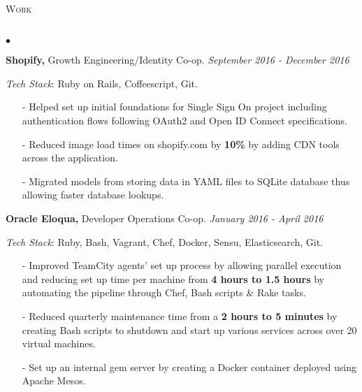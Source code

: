 \documentclass[11pt]{article}
\newcommand{\lineunder}{\vspace*{-8pt} \\ \hspace*{-18pt} \hrulefill \\}
\newcommand{\header}[1]{{\hspace*{-15pt}\vspace*{6pt} \textsc{#1}} \vspace*{-6pt} \lineunder }
\newenvironment{achievements}{\begin{list}{$\bullet$}{\topsep 0pt \itemsep -1.5pt \leftmargin 5pt}}{\vspace*{4pt}\end{list}}
\begin{document}
\header{\fontsize{11.4}{10}\selectfont Work}
\begin{achievements}

\item \textbf{Shopify,} Growth Engineering/Identity Co-op. \hfill \textit {September 2016 - December 2016}

\vspace{1pt}
\item[ ] \textit{Tech Stack}: Ruby on Rails, Coffeescript, Git.
\vspace{3pt}

\begin{itemize}
\item[-] Helped set up initial foundations for Single Sign On project including authentication flows following OAuth2 and Open ID Connect specifications.
\vspace{3pt}
\item[-] Reduced image load times on shopify.com by \textbf{10\%} by adding CDN tools across the application.
\vspace{3pt}
\item[-] Migrated models from storing data in YAML files to SQLite database thus allowing faster database lookups.

\end{itemize}

\vspace{6pt}

\item \textbf{Oracle Eloqua,} Developer Operations Co-op. \hfill \textit {January 2016 - April 2016}

\vspace{1pt}
\item[ ] \textit{Tech Stack}: Ruby, Bash, Vagrant, Chef, Docker, Sensu, Elasticsearch, Git.
\vspace{3pt}

\begin{itemize}
\item[-]Improved TeamCity agents' set up process by allowing parallel execution and reducing set up time per machine from \textbf{4 hours to 1.5 hours} by automating the pipeline through Chef, Bash scripts \& Rake tasks.
\vspace{2pt}
\vspace{3pt}
\item[-]Reduced quarterly maintenance time from a \textbf{2 hours to 5 minutes} by creating Bash scripts to shutdown and start up various services across over 20 virtual machines.
\vspace{3pt}
\item[-]Set up an internal gem server by creating a Docker container deployed using Apache Mesos.
\end{itemize}


\end{achievements}
\end{document}

